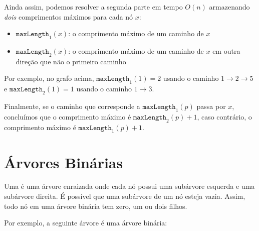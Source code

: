 Ainda assim, podemos resolver a segunda parte em tempo $O(n)$ armazenando \emph{dois} comprimentos máximos para cada nó $x$:
\begin{itemize}
\item $\texttt{maxLength}_1(x)$: o comprimento máximo de um caminho de $x$
\item $\texttt{maxLength}_2(x)$: o comprimento máximo de um caminho de $x$ em outra direção que não o primeiro caminho
\end{itemize}
Por exemplo, no grafo acima, $\texttt{maxLength}_1(1)=2$ usando o caminho $1 \rightarrow 2 \rightarrow 5$ e $\texttt{maxLength}_2(1)=1$ usando o caminho $1 \rightarrow 3$.

Finalmente, se o caminho que corresponde a $\texttt{maxLength}_1(p)$ passa por $x$, concluímos que o comprimento máximo é $\texttt{maxLength}_2(p)+1$, caso contrário, o comprimento máximo é $\texttt{maxLength}_1(p)+1$.

\section{Árvores Binárias}


\begin{samepage}
Uma  é uma árvore enraizada onde cada nó possui uma subárvore esquerda e uma subárvore direita. É possível que uma subárvore de um nó esteja vazia. Assim, todo nó em uma árvore binária tem zero, um ou dois filhos.

Por exemplo, a seguinte árvore é uma árvore binária:
\begin{center}
\end{center}
\end{samepage}


